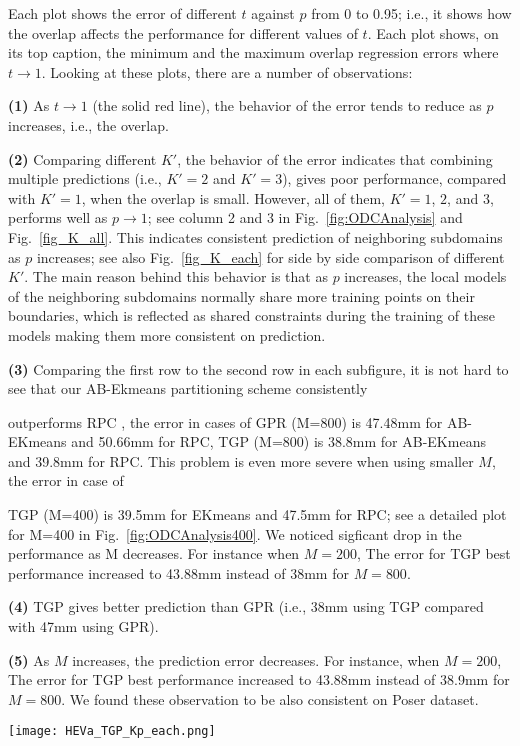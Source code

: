Each plot shows the error of different $t$ against $p$ from 0 to 0.95; i.e., it shows how the overlap affects the performance for different values of $t$. Each plot shows, on its top caption, the minimum and the maximum overlap regression errors where $t \to 1$. Looking at these plots, there are a number of observations:

\noindent\textbf{(1)} As $t \to 1$ (the solid red line), the behavior of the error tends to reduce as $p$ increases, i.e., the overlap.

\noindent\textbf{(2)} Comparing different $K'$, the behavior of the error indicates that combining multiple predictions (i.e., $K'=2$ and $K'=3$), gives poor performance, compared with  $K'=1$,  when the overlap is small. However, all of them, $K'=1$, $2$, and  $3$, performs well as  $p \to 1$; see column 2 and 3 in Fig.~\ref{fig:ODCAnalysis} and Fig.~\ref{fig_K_all}.  This indicates consistent prediction of neighboring subdomains as $p$ increases; see also Fig.~\ref{fig_K_each} for side by side comparison of different $K'$. The main reason behind this behavior is  that as $p$ increases, the local models of the  neighboring subdomains normally share more training points on their boundaries, which is reflected as shared constraints during the training of these models making them more consistent on prediction. 

\noindent\textbf{(3)} Comparing the first row to the second row in each subfigure, it is not hard to see that our AB-Ekmeans partitioning scheme consistently  outperforms RPC \cite{Chalupka:2013}, \eg the error in cases of  GPR (M=800) is  47.48mm for AB-EKmeans and 50.66mm for RPC, TGP (M=800) is  38.8mm for AB-EKmeans and 39.8mm for RPC. This problem is even more severe when using smaller $M$, \eg the error in case of  TGP (M=400) is 39.5mm for EKmeans and 47.5mm for RPC; see a detailed plot for M=400 in Fig.~\ref{fig:ODCAnalysis400}.  We noticed sigficant drop in the performance as M decreases. For instance when $M=200$, The error for TGP best performance increased to 43.88mm instead of 38mm for $M=800$.  

\noindent\textbf{(4)} TGP gives better prediction than GPR (i.e., 38mm using TGP compared with 47mm using GPR). 

\noindent\textbf{(5)} As $M$ increases, the prediction error decreases. For instance, when $M=200$, The error for TGP best performance increased to 43.88mm instead of 38.9mm for $M=800$. We found these observation to be also consistent on Poser dataset. 
\begin{figure*}[t!]
\texttt{[image: HEVa\_TGP\_Kp\_each.png]}
\caption{HumanEva TGP different K' as overlap increase, ,  M=800}
\label{fig_K_each}
\end{figure*}

